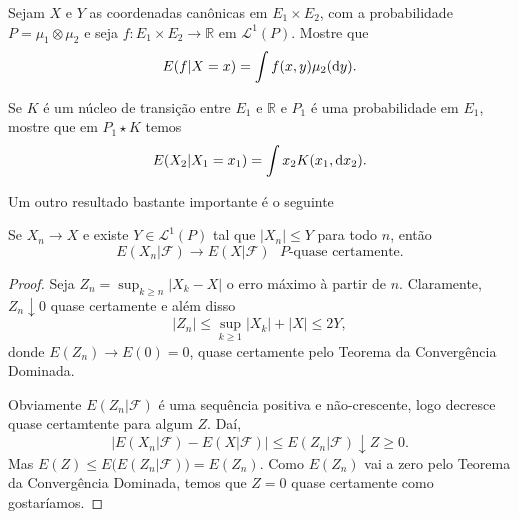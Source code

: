 \begin{exercise}
  Sejam $X$ e $Y$ as coordenadas canônicas em $E_1 \times E_2$, com a probabilidade $P = \mu_1 \otimes \mu_2$ e seja $f:E_1 \times E_2 \to \mathbb{R}$ em $\mathcal{L}^1(P)$.
  Mostre que
  \begin{equation}
     E(f|X = x) = \int f(x, y) \mu_2(\mathop{}\!\mathrm{d} y).
  \end{equation}
\end{exercise}

\begin{exercise}
  Se $K$ é um núcleo de transição entre $E_1$ e $\mathbb{R}$ e $P_1$ é uma probabilidade em $E_1$, mostre que em $P_1 \star K$ temos
  \begin{equation}
    E(X_2|X_1 = x_1) = \int x_2 K(x_1, \mathop{}\!\mathrm{d} x_2).
  \end{equation}
\end{exercise}

Um outro resultado bastante importante é o seguinte

\begin{theorem}
  Se $X_n \to X$ e existe $Y \in \mathcal{L}^1(P)$ tal que $|X_n| \leq Y$ para todo $n$, então
  \begin{equation}
    E(X_n | \mathcal{F}) \to E(X|\mathcal{F}) \text{ $P$-quase certamente.}
  \end{equation}
\end{theorem}

\begin{proof}
  Seja $Z_n = \sup_{k \geq n} |X_k - X|$ o erro máximo à partir de $n$.
  Claramente, $Z_n \downarrow 0$ quase certamente e além disso
  \begin{equation}
    |Z_n| \leq \sup_{k \geq 1} |X_k| + |X| \leq 2 Y,
  \end{equation}
  donde $E(Z_n) \to E(0) = 0$, quase certamente pelo Teorema da Convergência Dominada.

  Obviamente $E(Z_n|\mathcal{F})$ é uma sequência positiva e não-crescente, logo decresce quase certamtente para algum $Z$.
  Daí,
  \begin{equation}
    \big| E(X_n | \mathcal{F}) - E(X | \mathcal{F}) \big| \leq E(Z_n | \mathcal{F}) \downarrow Z \geq 0.
  \end{equation}
  Mas $E(Z) \leq E\big( E(Z_n|\mathcal{F}) \big) = E(Z_n)$.
  Como $E(Z_n)$ vai a zero pelo Teorema da Convergência Dominada, temos que $Z = 0$ quase certamente como gostaríamos.
\end{proof}

